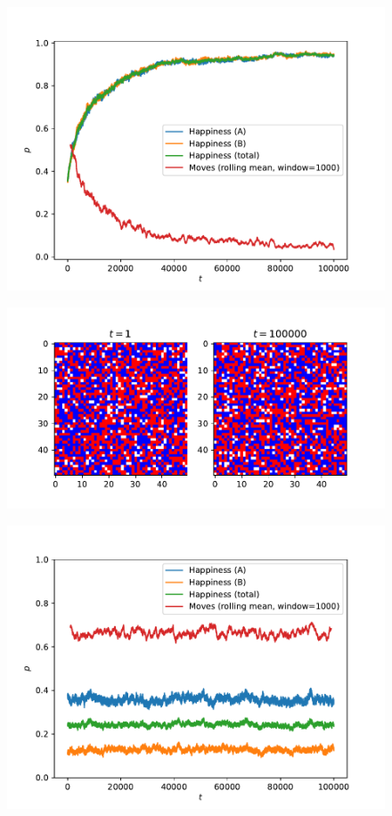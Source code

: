 \documentclass[a4paper, 12pt]{article}
\begin{document}
\begin{figure}[h!]
    \centering
    \includegraphics[width=0.9\linewidth]{../Anti-Gregarious/happiness.pdf}
\end{figure}

\newpage

\begin{figure}[h!]
    \centering
    \includegraphics[width=\linewidth]{../Frustration/town.pdf}
\end{figure}

\begin{figure}[h!]
    \centering
    \includegraphics[width=\linewidth]{../Frustration/happiness.pdf}
\end{figure}
\end{document}
